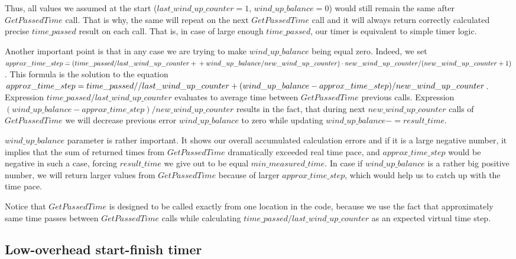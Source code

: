\documentclass{article}
\begin{document}
Thus, all values we assumed at the start ($last\_wind\_up\_counter = 1$, $wind\_up\_balance = 0$) would still remain the same after $GetPassedTime$ call. That is why, the same will repeat on the next $GetPassedTime$ call and it will always return correctly calculated precise $time\_passed$ result on each call. That is, in case of large enough $time\_passed$, our timer is equivalent to simple timer logic.

Another important point is that in any case we are trying to make $wind\_up\_balance$ being equal zero. Indeed, we set $approx\_time\_step = (time\_passed / last\_wind\_up\_counter +\\+ wind\_up\_balance / new\_wind\_up\_counter) \cdot new\_wind\_up\_counter /  (new\_wind\_up\_counter + 1)$. This formula is the solution to the equation $approx\_time\_step = time\_passed /  \\ / last\_wind\_up\_counter + (wind\_up\_balance - approx\_time\_step) / new\_wind\_up\_counter$. Expression $time\_passed / last\_wind\_up\_counter$ evaluates to average time between $GetPassedTime$ previous calls. Expression $(wind\_up\_balance - approx\_time\_step) / new\_wind\_up\_counter$ results in the fact, that during next $new\_wind\_up\_counter$ calls of $GetPassedTime$ we will decrease previous error $wind\_up\_balance$ to zero while updating $wind\_up\_balance -= result\_time$.

$wind\_up\_balance$ parameter is rather important. It shows our overall accumulated calculation errors and if it is a large negative number, it implies that the sum of returned times from $GetPassedTime$ dramatically exceeded real time pace, and $approx\_time\_step$ would be negative in such a case, forcing $result\_time$ we give out to be equal $min\_measured\_time$. In case if $wind\_up\_balance$ is a rather big positive number, we will return larger values from $GetPassedTime$ because of larger $approx\_time\_step$, which would help us to catch up with the time pace.

Notice that $GetPassedTime$ is designed to be called exactly from one location in the code, because we use the fact that approximately same time passes between $GetPassedTime$ calls while calculating $time\_passed / last\_wind\_up\_counter$ as an expected virtual time step.

\subsection{Low-overhead start-finish timer}
\label{subsec:low_overhead_start_finish_timer}
\end{document}

